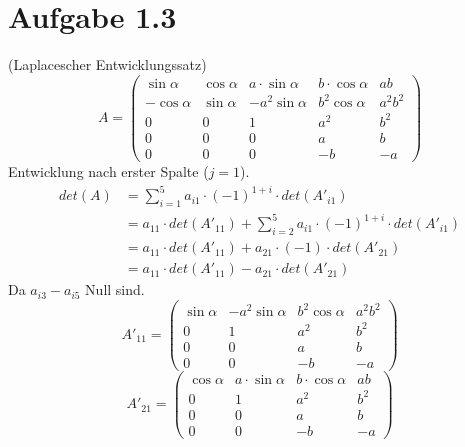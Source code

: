 \documentclass{article} %
\begin{document}
\section{Aufgabe 1.3}
(Laplacescher Entwicklungssatz) 
\[
A = \begin{pmatrix}
\sin \alpha & \cos \alpha & a \cdot \sin \alpha & b \cdot \cos \alpha & ab \\
- \cos \alpha & \sin \alpha & -a^2 \sin \alpha & b^2 \cos \alpha & a^2 b^2 \\
0 & 0 & 1 & a^2 & b^2 \\
0 & 0 & 0 & a & b \\
0 & 0 & 0 & -b & -a
\end{pmatrix}
\]
Entwicklung nach erster Spalte ($j = 1$). 
\begin{align*}
    det(A) & = \sum^5_{i =1} a_{i1} \cdot (-1)^{1+i} \cdot det(A'_{i1})  \\
    & = a_{11} \cdot det(A'_{11}) + \sum^5_{i =2} a_{i1} \cdot (-1)^{1+i} \cdot det(A'_{i1}) \\
    & = a_{11} \cdot det(A'_{11}) + a_{21} \cdot (-1)\cdot det(A'_{21})  \\
    & = a_{11} \cdot det(A'_{11}) - a_{21} \cdot det(A'_{21})  
\end{align*}
Da $a_{i3} - a_{i5}$ Null sind.
\[
A'_{11} = \begin{pmatrix}
 \sin \alpha & -a^2 \sin \alpha & b^2 \cos \alpha & a^2 b^2 \\
 0 & 1 & a^2 & b^2 \\
 0 & 0 & a & b \\
0 & 0 & -b & -a
\end{pmatrix}
\]
\[
A'_{21} = \begin{pmatrix}
 \cos \alpha & a \cdot \sin \alpha & b \cdot \cos \alpha & ab \\
 0 & 1 & a^2 & b^2 \\
 0 & 0 & a & b \\
 0 & 0 & -b & -a
\end{pmatrix}
\]
\end{document}
